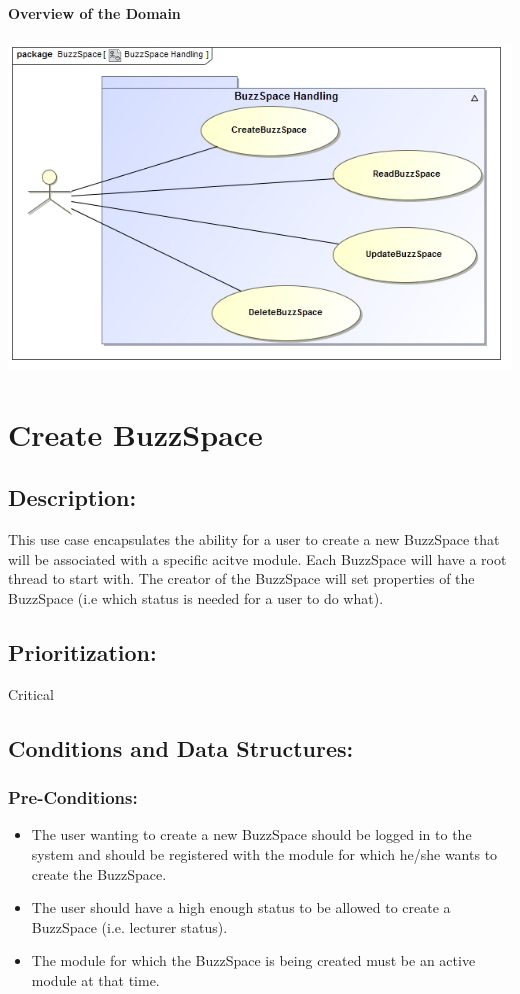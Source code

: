 \documentclass[a4paper,11pt]{article}
\begin{document}
\textbf{Overview of the Domain}\\\\
\includegraphics[width=1\linewidth]{./Images/BuzzSpaceHandling/Overview.jpg}\\
\section{Create BuzzSpace}
\subsection*{Description:}This use case encapsulates the ability for a user to create a new BuzzSpace that will be associated with a specific acitve module. 
Each BuzzSpace will have a root thread to start with. The creator of the BuzzSpace will set properties of the BuzzSpace (i.e which status is needed for a user 
to do what). 
\subsection{Prioritization:}Critical
\subsection{Conditions and Data Structures:}
\subsubsection*{Pre-Conditions:}
\begin{itemize}
	\item The user wanting to create a new BuzzSpace should be logged in to the system and should be registered with the module for which he/she wants to
	create the BuzzSpace. 
	\item The user should have a high enough status to be allowed to create a BuzzSpace (i.e. lecturer status).
	\item The module for which the BuzzSpace is being created must be an active module at that time.
\end{itemize}
\end{document}
